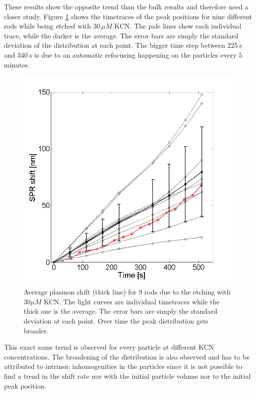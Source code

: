 \documentclass[twocolumn]{article}
\begin{document}
These results show the opposite trend than the bulk results and therefore need a
closer study. Figure \ref{fig:plasmon_average} shows the timetraces of the peak
positions for nine different rods while being etched with $30\,\mu M$ KCN. The
pale lines show each individual trace, while the darker is the average. The error
bars are simply the standard deviation of the distribution at each point. The
bigger time step between $225\,s$ and $340\,s$ is due to an automatic refocusing
happening on the particles every $5$ minutes.

\begin{figure}[hbt]
 \centering
 \includegraphics[width=0.95\linewidth]{plasmon_average.png}
 \caption{Average plasmon shift (thick line) for 9 rods due to the etching with
 $30\mu M$ KCN. The light curves are individual timetraces while the thick one is the
 average. The error bars are simply the standard deviation at each point. Over
 time the peak distribution gets broader.}
 \label{fig:plasmon_average}
\end{figure}

This exact same trend is observed for every particle at different KCN
concentrations. The broadening of the distribution is also observed and has to
be attributed to intrinsic inhomogenities in the particles since it is not
possible to find a trend in the shift rate nor with the initial particle 
volume nor to the initial peak position. 
\end{document}
